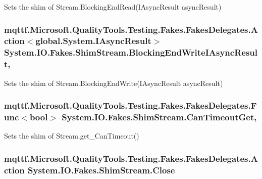 Sets the shim of Stream.\-Blocking\-End\-Read(\-I\-Async\-Result async\-Result)

\hypertarget{class_system_1_1_i_o_1_1_fakes_1_1_shim_stream_acbedf176129493362d90e311d3c31b1b}{
\subsubsection[{Blocking\-End\-Write\-I\-Async\-Result}]{\setlength{\rightskip}{0pt plus 5cm}mqttf.\-Microsoft.\-Quality\-Tools.\-Testing.\-Fakes.\-Fakes\-Delegates.\-Action$<$global.\-System.\-I\-Async\-Result$>$ System.\-I\-O.\-Fakes.\-Shim\-Stream.\-Blocking\-End\-Write\-I\-Async\-Result\hspace{0.3cm}{\ttfamily [static]}, {\ttfamily [set]}}}\label{class_system_1_1_i_o_1_1_fakes_1_1_shim_stream_acbedf176129493362d90e311d3c31b1b}


Sets the shim of Stream.\-Blocking\-End\-Write(\-I\-Async\-Result async\-Result)

\hypertarget{class_system_1_1_i_o_1_1_fakes_1_1_shim_stream_a24c535d474ee5a439e728e1cb80572dd}{
\subsubsection[{Can\-Timeout\-Get}]{\setlength{\rightskip}{0pt plus 5cm}mqttf.\-Microsoft.\-Quality\-Tools.\-Testing.\-Fakes.\-Fakes\-Delegates.\-Func$<$bool$>$ System.\-I\-O.\-Fakes.\-Shim\-Stream.\-Can\-Timeout\-Get\hspace{0.3cm}{\ttfamily [get]}, {\ttfamily [set]}}}\label{class_system_1_1_i_o_1_1_fakes_1_1_shim_stream_a24c535d474ee5a439e728e1cb80572dd}


Sets the shim of Stream.\-get\-\_\-\-Can\-Timeout()

\hypertarget{class_system_1_1_i_o_1_1_fakes_1_1_shim_stream_ad42bace57094b045aeea29dee4c61cc4}{
\subsubsection[{Close}]{\setlength{\rightskip}{0pt plus 5cm}mqttf.\-Microsoft.\-Quality\-Tools.\-Testing.\-Fakes.\-Fakes\-Delegates.\-Action System.\-I\-O.\-Fakes.\-Shim\-Stream.\-Close\hspace{0.3cm}{\ttfamily [set]}}}\label{class_system_1_1_i_o_1_1_fakes_1_1_shim_stream_ad42bace57094b045aeea29dee4c61cc4}



